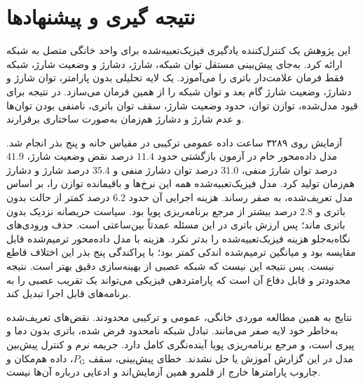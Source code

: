 \chapter{نتیجه گیری و پیشنهادها}
\label{chap:conclusion}

این پژوهش یک کنترل‌کننده یادگیری فیزیک‌تعبیه‌شده برای واحد خانگی متصل به شبکه ارائه کرد. به‌جای پیش‌بینی مستقل توان شبکه، شارژ، دشارژ و وضعیت شارژ، شبکه فقط فرمان علامت‌دار باتری را می‌آموزد. یک لایه تحلیلی بدون پارامتر، توان شارژ و دشارژ، وضعیت شارژ گام بعد و توان شبکه را از همین فرمان می‌سازد. در نتیجه برای قیود مدل‌شده، توازن توان، حدود وضعیت شارژ، سقف توان باتری، نامنفی بودن توان‌ها و عدم شارژ و دشارژ هم‌زمان به‌صورت ساختاری برقرارند.

آزمایش روی ۳۲۸۹ ساعت داده عمومی ترکیبی در مقیاس خانه و پنج بذر انجام شد. مدل داده‌محور خام در آزمون بازگشتی حدود $11{.}4$ درصد نقض وضعیت شارژ، $41{.}9$ درصد توان شارژ منفی، $31{.}0$ درصد توان دشارژ منفی و $35{.}4$ درصد شارژ و دشارژ هم‌زمان تولید کرد. مدل فیزیک‌تعبیه‌شده همه این نرخ‌ها و باقیمانده توازن را، بر اساس مدل تعریف‌شده، به صفر رساند. هزینه اجرایی آن حدود $6{.}2$ درصد کمتر از حالت بدون باتری و $2{.}8$ درصد بیشتر از مرجع برنامه‌ریزی پویا بود. سیاست حریصانه نزدیک بدون باتری ماند؛ پس ارزش باتری در این مسئله عمدتاً بین‌ساعتی است. حذف ورودی‌های نگاه‌به‌جلو هزینه فیزیک‌تعبیه‌شده را بدتر نکرد. هزینه با مدل داده‌محور ترمیم‌شده قابل مقایسه بود و میانگین ترمیم‌شده اندکی کمتر بود؛ با پراکندگی پنج بذر این اختلاف قاطع نیست. پس نتیجه این نیست که شبکه عصبی از بهینه‌سازی دقیق بهتر است. نتیجه محدودتر و قابل دفاع آن است که پارامتردهی فیزیکی می‌تواند یک تقریب عصبی را به برنامه‌های قابل اجرا تبدیل کند.

نتایج به همین مطالعه موردی خانگی، عمومی و ترکیبی محدودند. نقض‌های تعریف‌شده به‌خاطر خود لایه صفر می‌مانند. تبادل شبکه نامحدود فرض شده، باتری بدون دما و پیری است، و مرجع برنامه‌ریزی پویا آینده‌نگری کامل دارد. جریمه نرم و کنترل پیش‌بین مدل در این گزارش آموزش یا حل نشدند. خطای پیش‌بینی، سقف $P_{\mathrm{G}}$، داده هم‌مکان و جاروب پارامترها خارج از قلمرو همین آزمایش‌اند و ادعایی درباره آن‌ها نیست.
